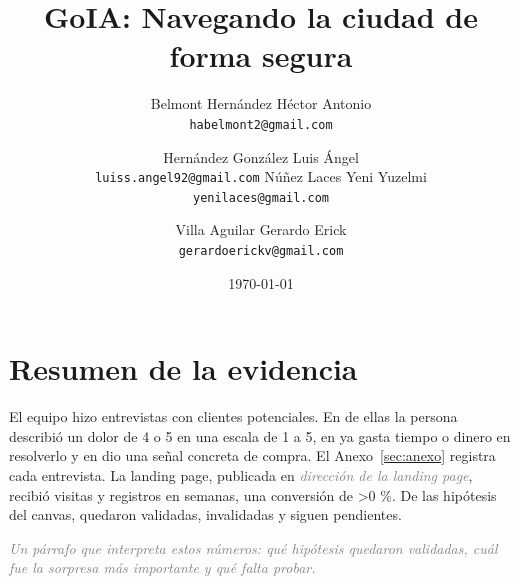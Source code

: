 \documentclass[11pt]{article}
\title{GoIA: Navegando la ciudad de forma segura}
\author{%
  Belmont Hernández Héctor Antonio\\ {\small\texttt{habelmont2@gmail.com}}
  \and
  Hernández González Luis Ángel\\ {\small\texttt{luiss.angel92@gmail.com}}
  \otrorenglon
  Núñez Laces Yeni Yuzelmi\\ {\small\texttt{yenilaces@gmail.com}}
  \and
  Villa Aguilar Gerardo Erick\\ {\small\texttt{gerardoerickv@gmail.com}}
}
\date{\today}
\newcommand{\pendiente}[1]{\textcolor{gray}{\emph{#1}}}
\newcounter{nent}\newcounter{ndolor}\newcounter{npaga}\newcounter{npagaria}
\newcounter{nval}\newcounter{ninval}\newcounter{npend}
\newcounter{nsem}\def\totVis{0}\def\totReg{0}
\begin{document}
\maketitle
\thispagestyle{empty}


\section{Resumen de la evidencia}
\label{sec:resumen}

El equipo hizo \thenent{} entrevistas con clientes potenciales. En \thendolor{} de ellas la
persona describió un dolor de 4 o 5 en una escala de 1 a 5, en \thenpaga{} ya gasta tiempo o
dinero en resolverlo y en \thenpagaria{} dio una señal concreta de compra. El
Anexo~\ref{sec:anexo} registra cada entrevista. La landing page, publicada en
\pendiente{dirección de la landing page}, recibió \totVis{} visitas y \totReg{} registros en
\thensem{} semanas, una conversión de
\ifnum\totVis>0 \fi\%. De las hipótesis del canvas,
\thenval{} quedaron validadas, \theninval{} invalidadas y \thenpend{} siguen pendientes.

\pendiente{Un párrafo que interpreta estos números: qué hipótesis quedaron validadas, cuál fue
la sorpresa más importante y qué falta probar.}

\end{document}
